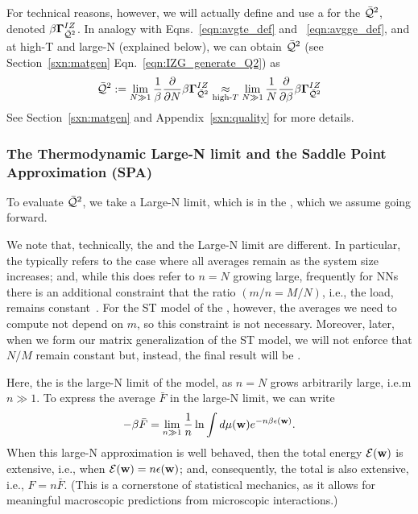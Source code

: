 For technical reasons, however, we will actually define and use a
\GeneratingFunction for the \AverageLayerQualitySquared $\bar{\mathcal{Q}}^{2}$, denoted $\beta\mathbf{\Gamma}^{IZ}_{\bar{\mathcal{Q}}^{2}}$.
In analogy with Eqns.~\ref{eqn:avgte_def} and ~\ref{eqn:avgge_def}, and at high-T and large-N (explained below),
we can obtain $\bar{\mathcal{Q}}^{2}$ (see Section~\ref{sxn:matgen} Eqn.~\ref{eqn:IZG_generate_Q2}) as
\begin{align}
  \label{eqn:QT_def}
  \bar{\mathcal{Q}}^{2} := \lim_{N\gg 1}\frac{1}{\beta}\frac{\partial }{\partial N}\beta\mathbf{\Gamma}^{IZ}_{\bar{\mathcal{Q}}^{2}}
  \underset{\text{high-}T}{\approx}
\lim_{N\gg 1}\frac{1}{N}\frac{\partial }{\partial \beta}\beta\mathbf{\Gamma}^{IZ}_{\bar{\mathcal{Q}}^{2}}
\end{align}
See Section~\ref{sxn:matgen} and Appendix~\ref{sxn:quality} for more details.


\subsubsection{The Thermodynamic Large-N limit and the Saddle Point Approximation (SPA)}
\label{sxn:largeN_and_SPA}
To evaluate $\bar{\mathcal{Q}}^{2}$, we take a Large-N limit, which is 
in the \ThermodynamicLimit, which we assume going forward.

We note that, technically, the \ThermodynamicLimit and the Large-N limit are different.
In particular, the \ThermodynamicLimit typically refers to the case where all \Thermodynamic averages remain \SizeIntensive as the system size increases; and, while this does refer to $n=N$ growing large, frequently for NNs there is an additional constraint that the ratio $(m/n = M/N)$, i.e., the load, remains constant~\cite{SST92,MM17_TR_v1}.
For the ST model of the \Perceptron, however, the \Thermodynamic averages we need to compute not depend on $m$,
so this constraint is not necessary.
Moreover, later, when we form our matrix generalization of the ST model, we will not
enforce that $N/M$ remain constant but, instead, the final result will be \SizeConsistent.

Here, the \ThermodynamicLimit is the large-N limit of the model, as $n=N$ grows arbitrarily large, i.e.m $n \gg 1$.
To express the average \FreeEnergy $\bar{F}$ in the large-N limit, we can write
\begin{align}
  -\beta\bar{F} = \lim_{n\gg 1}\frac{1}{n}\ln \int d\mu({\mathbf{w}}) e^{-n\beta\epsilon({\mathbf{w}})}  .
\end{align}
When this large-N approximation is well behaved,
then the total energy $\mathcal{E}(\mathbf{w})$ is extensive, i.e., when $\mathcal{E}(\mathbf{w})=n\epsilon({\mathbf{w}})$;
and, consequently, the total \FreeEnergy is also extensive, i.e., $F=n\bar{F}$.
(This is a cornerstone of statistical mechanics, as it allows for meaningful macroscopic predictions from microscopic interactions.)


